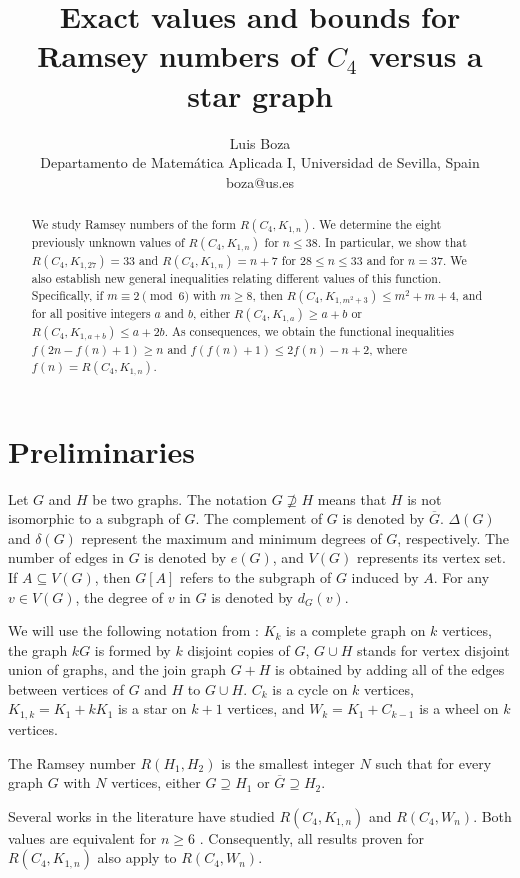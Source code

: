 \documentclass[12]{article}
\author{%
Luis Boza\hspace{-1.4mm}\vspace{-.42mm} \\
\small Departamento de Matem\'atica Aplicada I, Universidad de Sevilla, Spain\hspace{-1.4mm}\vspace{-.42mm} \\
\small boza@us.es}
\title{
Exact values and bounds for Ramsey numbers of $C_4$ versus a star graph}
\date{}
\begin{document}
\maketitle
\begin{abstract}
We study Ramsey numbers of the form $R(C_4,K_{1,n})$. We determine the eight previously unknown values of $R(C_4,K_{1,n})$ for $n\le 38$. In particular, we show that $R(C_4,K_{1,27})=33$ and $R(C_4,K_{1,n})=n+7$ for $28\le n\le 33$ and for $n=37$. We also establish new general inequalities relating different values of this function. Specifically, if $m\equiv 2\pmod 6$ with $m\ge 8$, then $R(C_4,K_{1,m^2+3})\le m^2+m+4$, and for all positive integers $a$ and $b$, either $R(C_4,K_{1,a})\ge a+b$ or $R(C_4,K_{1,a+b})\le a+2b$. As consequences, we obtain the functional inequalities $f(2n-f(n)+1)\ge n$ and $f(f(n)+1)\le 2f(n)-n+2$, where $f(n)=R(C_4,K_{1,n})$.

\end{abstract}

\section{Preliminaries}

Let $G$ and $H$ be two graphs. The notation $G \nsupseteq H$ means that $H$ is not isomorphic to a subgraph of $G$. The complement of $G$ is denoted by $\overline{G}$. $\Delta(G)$ and $\delta(G)$ represent the maximum and minimum degrees of $G$, respectively. The number of edges in $G$ is denoted by $e(G)$, and $V(G)$ represents its vertex set. If $A \subseteq V(G)$, then $G[A]$ refers to the subgraph of $G$ induced by $A$. For any $v \in V(G)$, the degree of $v$ in $G$ is denoted by $d_G(v)$.

We will use the following notation from \cite{R}: $K_k$ is a complete graph on $k$ vertices, the graph $kG$ is formed by $k$ disjoint copies of $G$, $G\cup H$ stands for vertex disjoint union of graphs, and the join graph $G+H$ is obtained by adding all of the edges between vertices of $G$ and $H$ to $G\cup H$. $C_k$ is a cycle on $k$ vertices, $K_{1,k}=K_1+kK_1$ is a star on $k+1$ vertices, and $W_k=K_1+C_{k-1}$ is a wheel on $k$ vertices.

The Ramsey number $R(H_1,H_2)$ is the smallest integer $N$ such that for every graph $G$ with $N$ vertices, either $G \supseteq H_1$ or $\overline{G} \supseteq H_2$.

Several works in the literature have studied $R(C_4, K_{1,n})$ and $R(C_4, W_n)$. Both values are equivalent for $n \geq 6$ \cite{ZhaBC1}. Consequently, all results proven for $R(C_4, K_{1,n})$ also apply to $R(C_4, W_n)$.
\end{document}
